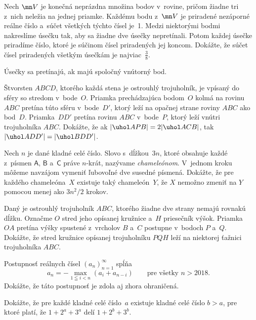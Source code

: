 {%
Nech $\mn V$ je konečná neprázdna množina bodov v~rovine, pričom žiadne tri z~nich neležia na jednej priamke. Každému bodu z~$\mn V$ je priradené nezáporné reálne číslo a~súčet všetkých týchto čísel je~1. Medzi niektorými bodmi nakreslíme úsečku tak, aby sa žiadne dve úsečky nepretínali. Potom každej úsečke priradíme číslo, ktoré je súčinom čísel priradených jej koncom. Dokážte, že súčet čísel priradených všetkým úsečkám je najviac~$\frac 38$.

\poznamka
Úsečky sa pretínajú, ak majú spoločný vnútorný bod.}

{%
Štvorsten $ABCD$, ktorého každá stena je ostrouhlý trojuholník, je vpísaný do sféry so stredom v~bode~$O$. Priamka prechádzajúca bodom~$O$ kolmá na rovinu $ABC$ pretína túto sféru v~bode~$D'$, ktorý leží na opačnej strane roviny $ABC$ ako bod~$D$. Priamka~$DD'$ pretína rovinu $ABC$ v~bode~$P$, ktorý leží vnútri trojuholníka $ABC$. Dokážte, že ak $|\uhol APB|=2|\uhol ACB|$, tak $|\uhol ADD'|=|\uhol BDD'|$.}

{%
Nech $n$ je dané kladné celé číslo. Slovo s~dĺžkou~$3n$, ktoré obsahuje každé z~písmen $\mathsf{A}$, $\mathsf{B}$ a~$\mathsf{C}$ práve $n$-krát, nazývame \textit{chameleónom}. V~jednom kroku môžeme navzájom vymeniť ľubovoľné dve susedné písmená. Dokážte, že pre každého chameleóna~$X$ existuje taký chameleón~$Y$, že $X$ nemožno zmeniť na $Y$ pomocou menej ako $3n^2/2$ krokov.}

{%
Daný je ostrouhlý trojuholník $ABC$, ktorého žiadne dve strany nemajú rovnakú dĺžku. Označme $O$ stred jeho opísanej kružnice a~$H$ priesečník výšok. Priamka~$OA$ pretína výšky spustené z~vrcholov $B$ a~$C$ postupne v~bodoch $P$ a~$Q$. Dokážte, že stred kružnice opísanej trojuholníku $PQH$ leží na niektorej ťažnici trojuholníka $ABC$.}

{%
Postupnosť reálnych čísel $(a_n)_{n=1}^\infty$ spĺňa
$$
a_n = -\max_{1\leqq i<n}(a_i + a_{n-i})\qquad\text{pre všetky $n>2018$.}
$$
Dokážte, že táto postupnosť je zdola aj zhora ohraničená.}

{%
Dokážte, že pre každé kladné celé číslo~$a$ existuje kladné celé číslo $b>a$, pre ktoré platí, že
$1+2^a+3^a$ delí $1+2^b+3^b$.}

